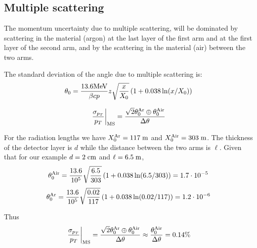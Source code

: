 \documentclass[a4paper,11pt,twoside]{article}
\begin{document}
\subsection{Multiple scattering}
The momentum uncertainty due to multiple scattering, will be dominated
by scattering in the material (argon) at the last layer of the first
arm and at the first layer of the second arm, and by the scattering in
the material (air) between the two arms.

The standard deviation of the angle due to multiple scattering is:
\begin{equation}
  \theta_0 = \frac{13.6{\rm MeV}}{\beta c p}z\sqrt{\frac{x}{X_0}}\left(1+0.038\ln(x/X_0)\right)
\end{equation}

\begin{equation}
  \left.\frac{\sigma_{p_T}}{p_T}\right|_{\rm MS}= \frac{\sqrt{2}\theta^{\rm Ar}_0\oplus \theta^{\rm Air}_0}{\Delta\theta}
\end{equation}



For the radiation lengths we have $X_0^{\rm Ar}=117\;{\rm m}$ and $X_0^{\rm Air}=303\;{\rm m}$.
The thickness of the detector layer is $d$ while the distance between the two arms is $\ell$.
Given that for our example $d=2\;{\rm cm}$ and $\ell=6.5\;{\rm m}$,
\begin{equation}
\theta^{\rm Air}_{0} = \frac{13.6}{10^5}\sqrt{\frac{6.5}{303}}\left(1+0.038\ln(6.5/303)\right)=  1.7\cdot 10^{-5}
\end{equation}
\begin{equation}
\theta^{\rm Ar}_{0} = \frac{13.6}{10^5}\sqrt{\frac{0.02}{117}}\left(1+0.038\ln(0.02/117)\right)=  1.2\cdot 10^{-6}
\end{equation}

Thus
\begin{equation}
  \left.\frac{\sigma_{p_T}}{p_T}\right|_{\rm MS}= \frac{\sqrt{2}\theta^{\rm Ar}_0\oplus \theta^{\rm Air}_0}{\Delta\theta}\approx
  \frac{\theta^{\rm Air}_0}{\Delta\theta}= 0.14\%
\end{equation}
\end{document}
